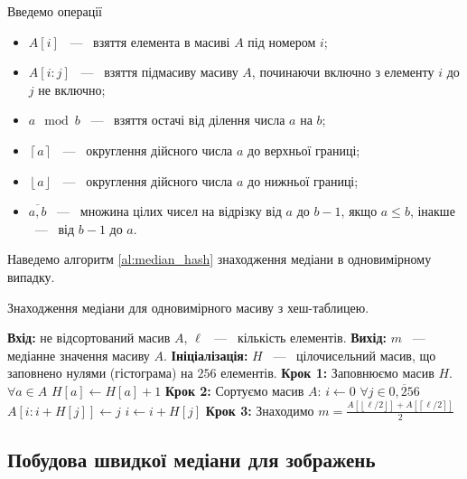 Введемо операції
\begin{itemize}
    \item $A[i]$ ~---~ взяття елемента в масиві $A$ під номером $i$;
    \item $A[i:j]$ ~---~ взяття підмасиву масиву $A$, починаючи включно з елементу $i$ до $j$ не включно;
    \item $a \mod b$ ~---~ взяття остачі від ділення числа $a$ на $b$;
    \item $\left\lceil a \right\rceil$ ~---~ округлення дійсного числа $a$ до верхньої границі;
    \item $\left\lfloor a \right\rfloor$ ~---~ округлення дійсного числа $a$ до нижньої границі;
    \item $\overline{a,b}$ ~---~ множина цілих чисел на відрізку від $a$ до $b-1$, якщо $a \le b$,
          інакше  ~---~ від $b-1$ до $a$.
\end{itemize}
Наведемо алгоритм \ref{al:median_hash} знаходження медіани в одновимірному випадку.

\begin{algorithm}[H]
    \caption{Знаходження медіани для одновимірного масиву з хеш-таблицею.}
    \label{al:median_hash}
    \begin{algorithmic}
        \State \textbf{Вхід:} не відсортований масив $A$, $\ell$ ~---~ кількість елементів.
        \State \textbf{Вихід:} $m$ ~---~ медіанне значення масиву $A$.
        \State \textbf{Ініціалізація:} $H$ ~---~ цілочисельний масив, що заповнено нулями (гістограма) на $256$ елементів.
        \State \textbf{Крок 1:} Заповнюємо масив $H$.
        \State $\forall a \in A$
        \State \qquad $ H[a] \gets H[a] + 1 $
        \State \textbf{Крок 2:} Сортуємо масив $ A $:
        \State $ i \gets 0 $
        \State $ \forall j \in \overline{0,256} $
        \State \qquad  $ A[i:i+H[j]] \gets j $
        \State \qquad  $ i \gets i + H[j] $
        \State \textbf{Крок 3:} Знаходимо $m = \frac{A[  \left\lfloor \ell/2 \right\rfloor   ] + A[\left\lceil \ell/2 \right\rceil ]}{2} $
    \end{algorithmic}
\end{algorithm}

\subsection{Побудова швидкої медіани для зображень}

